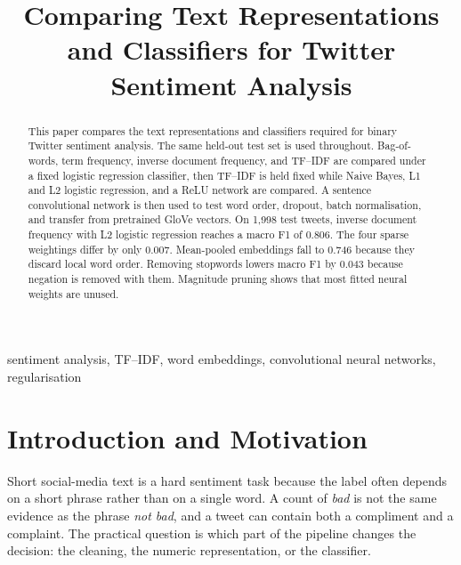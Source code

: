 \documentclass[conference]{IEEEtran}
\begin{document}
\title{Comparing Text Representations and Classifiers for Twitter Sentiment Analysis}

\author{
\and
{}
}

\maketitle

\begin{abstract}
This paper compares the text representations and classifiers required for binary Twitter sentiment analysis. The same held-out test set is used throughout. Bag-of-words, term frequency, inverse document frequency, and TF--IDF are compared under a fixed logistic regression classifier, then TF--IDF is held fixed while Naive Bayes, L1 and L2 logistic regression, and a ReLU network are compared. A sentence convolutional network is then used to test word order, dropout, batch normalisation, and transfer from pretrained GloVe vectors. On 1{,}998 test tweets, inverse document frequency with L2 logistic regression reaches a macro F1 of 0.806. The four sparse weightings differ by only 0.007. Mean-pooled embeddings fall to 0.746 because they discard local word order. Removing stopwords lowers macro F1 by 0.043 because negation is removed with them. Magnitude pruning shows that most fitted neural weights are unused.
\end{abstract}

\begin{IEEEkeywords}
sentiment analysis, TF--IDF, word embeddings, convolutional neural networks, regularisation
\end{IEEEkeywords}

\section{Introduction and Motivation}
Short social-media text is a hard sentiment task because the label often depends on a short phrase rather than on a single word. A count of \emph{bad} is not the same evidence as the phrase \emph{not bad}, and a tweet can contain both a compliment and a complaint. The practical question is which part of the pipeline changes the decision: the cleaning, the numeric representation, or the classifier.
\end{document}
